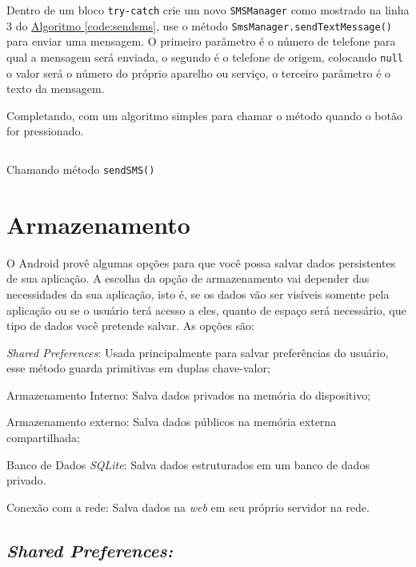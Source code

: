 \documentclass[a4paper,12pt,brazil,oneside]{book}
\begin{document}
		Dentro de um bloco \texttt{try-catch} crie um novo \texttt{SMSManager} como mostrado na linha 3 do  \hyperref[code:sendsms]{Algoritmo \ref*{code:sendsms}}, use o método \texttt{SmsManager.sendTextMessage()} para enviar uma mensagem. O primeiro parâmetro é o número de telefone para qual a mensagem será enviada, o segundo é o telefone de origem, colocando \texttt{null} o valor será o número do próprio aparelho ou serviço, o terceiro parâmetro é o texto da mensagem.
		
		Completando, com um algoritmo simples para chamar o método quando o botão for pressionado.

		\begin{listing}[H]
		\inputminted[linenos=true,fontsize=\small,frame=lines, framesep=2mm, tabsize=2,numbersep=5pt]{java}{src/api/comm/sendsms-oncreate.java}
		\caption{Chamando método \texttt{sendSMS()}}
		\label{code:sendsms2}
		\end{listing} 	

\chapter{Armazenamento}

	O Android provê algumas opções para que você possa salvar dados persistentes de sua aplicação. A escolha da opção de armazenamento vai depender das necessidades da sua aplicação, isto é, se os dados vão ser visíveis somente pela aplicação ou se o usuário terá acesso a eles, quanto de espaço será necessário, que tipo de dados você pretende salvar.
	As opções são: 
	\bi
		\item \emph{Shared Preferences}: Usada principalmente para salvar preferências do usuário, esse método guarda primitivas em duplas chave-valor;
		\item Armazenamento Interno: Salva dados privados na memória do dispositivo;
		\item Armazenamento externo: Salva dados públicos na memória externa compartilhada;
		\item Banco de Dados \emph{SQLite}: Salva dados estruturados em um banco de dados privado.
		\item Conexão com a rede: Salva dados na \emph{web} em seu próprio servidor na rede.
	\ei
			
	\section{\emph{Shared Preferences:}}
		
\end{document}
